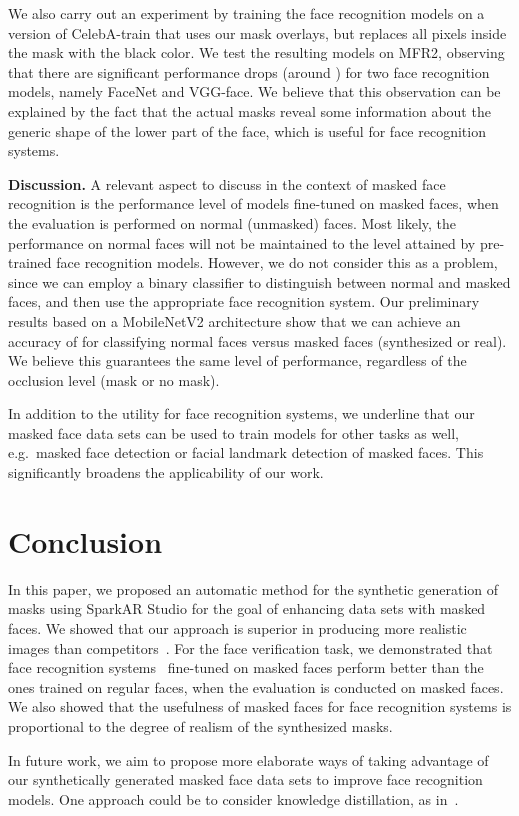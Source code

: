 \documentclass{article}
\begin{document}
We also carry out an experiment by training the face recognition models on a version of CelebA-train that uses our mask overlays, but replaces all pixels inside the mask with the black color. We test the resulting models on MFR2, observing that there are significant performance drops (around ) for two face recognition models, namely FaceNet and VGG-face. We believe that this observation can be explained by the fact that the actual masks reveal some information about the generic shape of the lower part of the face, which is useful for face recognition systems.



{\bf Discussion.} 
A relevant aspect to discuss in the context of masked face recognition is the performance level of models fine-tuned on masked faces, when the evaluation is performed on normal (unmasked) faces. Most likely, the performance on normal faces will not be maintained to the level attained by pre-trained face recognition models. However, we do not consider this as a problem, since we can employ a binary classifier to distinguish between normal and masked faces, and then use the appropriate face recognition system. Our preliminary results based on a MobileNetV2 architecture \cite{SandlerCVPR18} show that we can achieve an accuracy of  for classifying normal faces versus masked faces (synthesized or real). We believe this guarantees the same level of performance, regardless of the occlusion level (mask or no mask).

In addition to the utility for face recognition systems, we underline that our masked face data sets can be used to train models for other tasks as well, e.g.~masked face detection or facial landmark detection of masked faces. This significantly broadens the applicability of our work.

\section{Conclusion}

In this paper, we proposed an automatic method for the synthetic generation of masks using SparkAR Studio for the goal of enhancing data sets with masked faces. 
We showed that our approach is superior in producing more realistic images than competitors~\cite{wang2020arxiv, anwar2020arxiv, huang2021icassp}. For the face verification task, we demonstrated that face recognition systems~\cite{Schroff15CVPR,Deng19CVPR,Parkhi15BMVC} fine-tuned on masked faces perform better than the ones trained on regular faces, when the evaluation is conducted on masked faces. We also showed that the usefulness of masked faces for face recognition systems is proportional to the degree of realism of the synthesized masks.

In future work, we aim to propose more elaborate ways of taking advantage of our synthetically generated masked face data sets to improve face recognition models. One approach could be to consider knowledge distillation, as in~\cite{Georgescu-ICPR-2020}.
 




\end{document}
